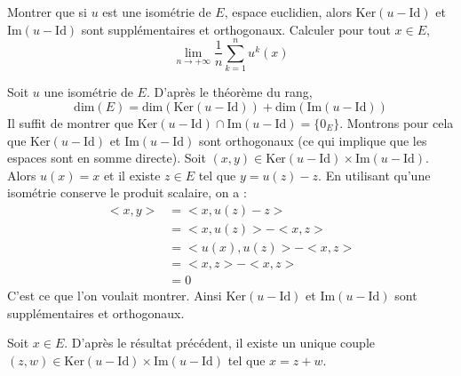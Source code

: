 \documentclass[a4paper,10pt]{report}
\begin{document}
\begin{Exercice}{} Montrer que si $u$ est une isométrie de $E$, espace euclidien, alors $\textrm{Ker}(u-\textrm{Id})$ et $\textrm{Im}(u-\textrm{Id})$ sont supplémentaires et orthogonaux. Calculer pour tout $x \in E$,
$$  \lim_{n \rightarrow + \infty} \dfrac{1}{n} \sum_{k=1}^n u^k(x)$$
\end{Exercice}

\corr Soit $u$ une isométrie de $E$. D'après le théorème du rang,
$$ \textrm{dim}(E) = \textrm{dim}(\textrm{Ker}(u-\textrm{Id})) + \textrm{dim}(\textrm{Im}(u-\textrm{Id}))$$
Il suffit de montrer que $\textrm{Ker}(u-\textrm{Id}) \cap \textrm{Im}(u-\textrm{Id})= \lbrace 0_E \rbrace$. Montrons pour cela que   $\textrm{Ker}(u-\textrm{Id})$ et $\textrm{Im}(u-\textrm{Id})$ sont orthogonaux (ce qui implique que les espaces sont en somme directe). Soit $(x,y) \in \textrm{Ker}(u-\textrm{Id}) \times \textrm{Im}(u-\textrm{Id})$. Alors $u(x)=x$ et il existe $z \in E$ tel que $y=u(z)-z$. En utilisant qu'une isométrie conserve le produit scalaire, on a :
\begin{align*}
<x,y> & = <x,u(z)-z> \\
& = <x,u(z)>-<x,z> \\
& = <u(x),u(z)> - <x,z> \\
& = <x,z>-<x,z> \\
& = 0
\end{align*}
C'est ce que l'on voulait montrer. Ainsi $\textrm{Ker}(u-\textrm{Id})$ et $\textrm{Im}(u-\textrm{Id})$ sont supplémentaires et orthogonaux. 

\medskip

\noindent Soit $x \in E$. D'après le résultat précédent, il existe un unique couple $(z,w) \in \textrm{Ker}(u-\textrm{Id}) \times \textrm{Im}(u-\textrm{Id})$ tel que $x=z+w$.
\end{document}
